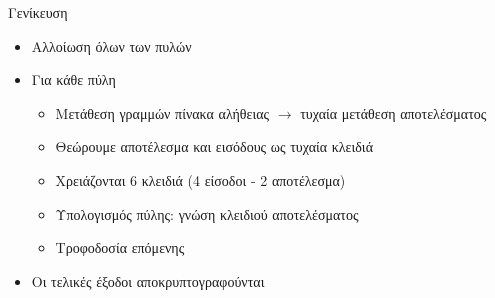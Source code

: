 \documentclass{beamer}
\begin{document}
\begin{frame}{Γενίκευση}
	 
	\begin{itemize}
		\item Αλλοίωση όλων των πυλών
		\item Για κάθε πύλη
		\begin{itemize}
			\item  Mετάθεση γραμμών πίνακα αλήθειας $\rightarrow$ τυχαία μετάθεση αποτελέσματος
			\item  Θεώρουμε αποτέλεσμα και εισόδους ως τυχαία κλειδιά
			\item  Χρειάζονται 6 κλειδιά (4 είσοδοι - 2 αποτέλεσμα)
			\item  Υπολογισμός πύλης: γνώση κλειδιού αποτελέσματος
			\item  Τροφοδοσία επόμενης
		\end{itemize}		
		\item Οι τελικές έξοδοι αποκρυπτογραφούνται
	\end{itemize}
	 
\end{frame}
\end{document}
